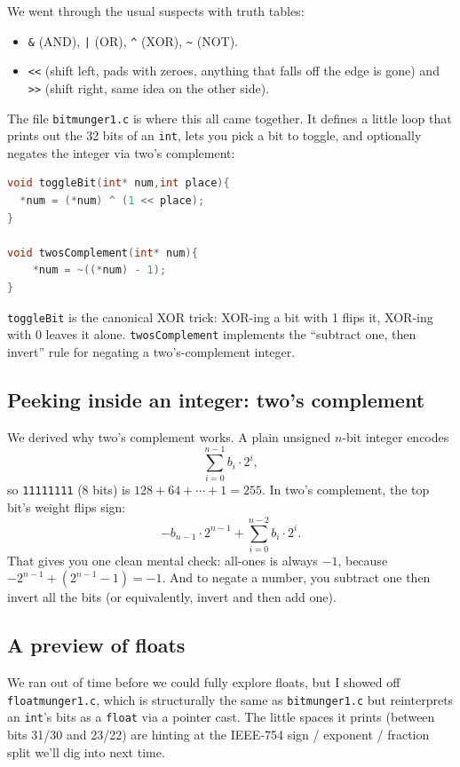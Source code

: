 \documentclass[11pt]{article}
\begin{document}
We went through the usual suspects with truth tables:
\begin{itemize}
  \item \texttt{\&} (AND), \texttt{|} (OR), \texttt{\^{}} (XOR),
    \texttt{\textasciitilde{}} (NOT).
  \item \texttt{<<} (shift left, pads with zeroes, anything that
    falls off the edge is gone) and \texttt{>>} (shift right, same
    idea on the other side).
\end{itemize}

The file \texttt{bitmunger1.c} is where this all came together. It
defines a little loop that prints out the 32 bits of an \texttt{int},
lets you pick a bit to toggle, and optionally negates the integer via
two's complement:

\begin{lstlisting}[language=C]
void toggleBit(int* num,int place){
  *num = (*num) ^ (1 << place);
}

void twosComplement(int* num){
    *num = ~((*num) - 1);
}
\end{lstlisting}

\texttt{toggleBit} is the canonical XOR trick: XOR-ing a bit with 1
flips it, XOR-ing with 0 leaves it alone. \texttt{twosComplement}
implements the ``subtract one, then invert'' rule for negating a
two's-complement integer.

\subsection*{Peeking inside an integer: two's complement}

We derived why two's complement works. A plain unsigned $n$-bit
integer encodes
\[
  \sum_{i=0}^{n-1} b_i \cdot 2^i,
\]
so \texttt{11111111} (8 bits) is $128 + 64 + \cdots + 1 = 255$. In
two's complement, the top bit's weight flips sign:
\[
  -b_{n-1} \cdot 2^{n-1} + \sum_{i=0}^{n-2} b_i \cdot 2^i.
\]
That gives you one clean mental check: all-ones is always $-1$,
because $-2^{n-1} + (2^{n-1} - 1) = -1$. And to negate a number, you
subtract one then invert all the bits (or equivalently, invert and
then add one).

\subsection*{A preview of floats}

We ran out of time before we could fully explore floats, but I showed
off \texttt{floatmunger1.c}, which is structurally the same as
\texttt{bitmunger1.c} but reinterprets an \texttt{int}'s bits as a
\texttt{float} via a pointer cast. The little spaces it prints
(between bits 31/30 and 23/22) are hinting at the IEEE-754 sign /
exponent / fraction split we'll dig into next time.
\end{document}
